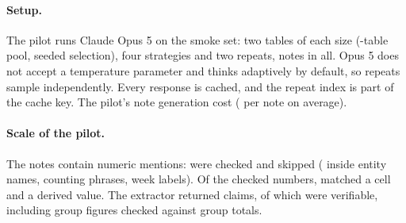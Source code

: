 \documentclass[11pt]{article}
\begin{document}
\paragraph{Setup.} The pilot runs Claude Opus 5 on the smoke set: two tables of each size (\NTables{}-table pool, seeded selection), four strategies and two repeats, \NNotes{} notes in all. Opus 5 does not accept a temperature parameter and thinks adaptively by default, so repeats sample independently. Every response is cached, and the repeat index is part of the cache key. The pilot's note generation cost \CostTotal{} (\CostPerNote{} per note on average).

\paragraph{Scale of the pilot.} The \NNotes{} notes contain \NMentions{} numeric mentions: \NChecked{} were checked and \NSkipped{} skipped (\NSkipEntity{} inside entity names, \NSkipCount{} counting phrases, \NSkipDate{} week labels). Of the checked numbers, \NCell{} matched a cell and \NDerived{} a derived value. The extractor returned \NClaims{} claims, of which \NVerifiable{} were verifiable, including \NGroupClaims{} group figures checked against group totals.

\begin{table}[t]
\centering
\caption{Pilot results for Claude Opus 5 (\NNotes{} notes; gate v3). Rates pool numbers or claims over notes; brackets give 95 percent bootstrap intervals over notes. With 12 notes per strategy the intervals are wide, and a cell with no event gets a zero-width interval that does not bound its rate.}
\label{tab:pilot}

\end{table}
\end{document}
